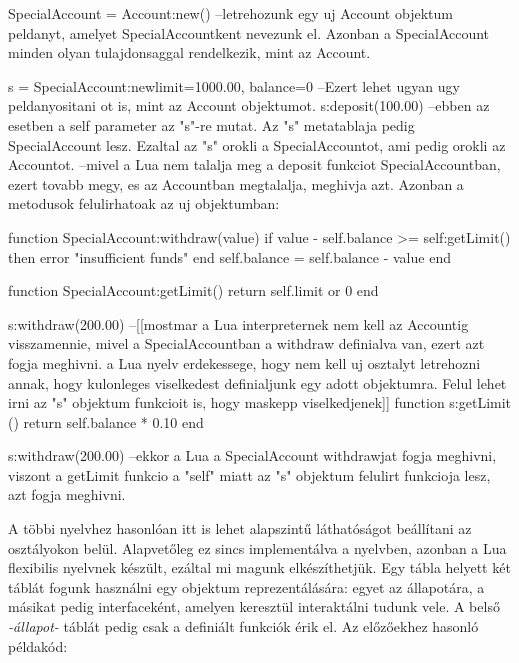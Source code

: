 \begin{lua}
SpecialAccount = Account:new() --letrehozunk egy uj Account objektum peldanyt, amelyet SpecialAccountkent nevezunk el. Azonban a SpecialAccount minden olyan tulajdonsaggal rendelkezik, mint az Account.

s = SpecialAccount:new{limit=1000.00, balance=0} --Ezert lehet ugyan ugy peldanyositani ot is, mint az Account objektumot.
s:deposit(100.00) --ebben az esetben a self parameter az "s"-re mutat. Az "s" metatablaja pedig SpecialAccount lesz. Ezaltal az "s" orokli a SpecialAccountot, ami pedig orokli az Accountot.
--mivel a Lua nem talalja meg a deposit funkciot SpecialAccountban, ezert tovabb megy, es az Accountban megtalalja, meghivja azt. Azonban a metodusok felulirhatoak az uj objektumban:

function SpecialAccount:withdraw(value)
	if value - self.balance >= self:getLimit() then
		error "insufficient funds"
	end
	self.balance = self.balance - value
end

function SpecialAccount:getLimit()
	return self.limit or 0
end

s:withdraw(200.00) --[[mostmar a Lua interpreternek nem kell az Accountig visszamennie, mivel a SpecialAccountban a withdraw definialva van, ezert azt fogja meghivni. 
a Lua nyelv erdekessege, hogy nem kell uj osztalyt letrehozni annak, hogy kulonleges viselkedest definialjunk egy adott objektumra. Felul lehet irni az "s" objektum funkcioit is, hogy maskepp viselkedjenek]]
function s:getLimit ()
	return self.balance * 0.10
end

s:withdraw(200.00) --ekkor a Lua a SpecialAccount withdrawjat fogja meghivni, viszont a getLimit funkcio a "self" miatt az "s" objektum felulirt funkcioja lesz, azt fogja meghivni.
\end{lua}
\pagebreak
{}
A többi nyelvhez hasonlóan itt is lehet alapszintű láthatóságot beállítani az osztályokon belül. Alapvetőleg ez sincs implementálva a nyelvben, azonban a Lua flexibilis nyelvnek készült, ezáltal mi magunk elkészíthetjük. Egy tábla helyett két táblát fogunk használni egy objektum reprezentálására:
egyet az állapotára, a másikat pedig interfaceként, amelyen keresztül interaktálni tudunk vele. A belső \textit{-állapot-} táblát pedig csak a definiált funkciók érik el. Az előzőekhez hasonló példakód:

